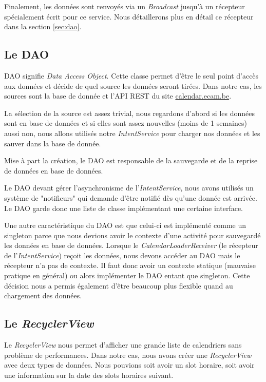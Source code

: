 \documentclass{article}
\begin{document}
            Finalement, les données sont renvoyés via un \textit{Broadcast} jusqu'à un récepteur
            spécialement écrit pour ce service. Nous détaillerons plus en détail ce récepteur dans
            la section \ref{sec:dao}.

        \label{sec:dao}
        \subsection{Le DAO}
            DAO signifie \textit{Data Access Object}. Cette classe permet d'être le seul point
            d'accès aux données et décide de quel source les données seront tirées. Dans notre cas,
            les sources sont la base de donnée et l'API REST du site \url{calendar.ecam.be}.

            La sélection de la source est assez trivial, nous regardons d'abord si les données sont
            en base de données et si elles sont assez nouvelles (moins de 1 semaines) aussi non,
            nous allons utilisés notre \textit{IntentService} pour charger nos données et les sauver
            dans la base de donnée.

            Mise à part la création, le DAO est responsable de la sauvegarde et de la reprise de
            données en base de données.

            Le DAO devant gérer l'asynchronisme de l'\textit{IntentService}, nous avons utilisés un
            système de "notifieurs" qui demande d'être notifié dès qu'une donnée est arrivée. Le DAO
            garde donc une liste de classe implémentant une certaine interface.

            Une autre caractéristique du DAO est que celui-ci est implémenté comme un singleton
            parce que nous devions avoir le contexte d'une activité pour sauvegardé les données en
            base de données. Lorsque le \textit{CalendarLoaderReceiver} (le récepteur de
            l'\textit{IntentService}) reçoit les données, nous devons accéder au DAO mais le
            récepteur n'a pas de contexte. Il faut donc avoir un contexte statique (mauvaise pratique
            en général) ou alors implémenter le DAO entant que singleton. Cette décision nous a
            permis également d'être beaucoup plus flexible quand au chargement des données.

        \subsection{Le \textit{RecyclerView}}
            Le \textit{RecyclerView} nous permet d'afficher une grande liste de calendriers sans
            problème de performances. Dans notre cas, nous avons créer une \textit{RecyclerView}
            avec deux types de données. Nous pouvions soit avoir un slot horaire, soit avoir une
            information sur la date des slots horaires suivant.
\end{document}
